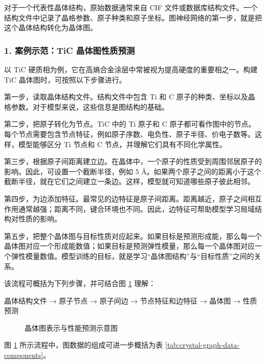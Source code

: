 对于一个代表性晶体结构，原始数据通常来自 CIF 文件或数据库结构文件。一个结构文件中记录了晶格参数、原子种类和原子坐标。图神经网络的第一步，就是把这个晶体结构转化为晶体图。


\subsubsection*{\textbf{1. 案例示范：TiC 晶体图性质预测}}

以 TiC 硬质相为例，它在高熵合金涂层中常被视为提高硬度的重要相之一。构建 TiC 晶体图时，可按照以下步骤进行。


第一步，读取晶体结构文件。结构文件中包含 Ti 和 C 原子的种类、坐标以及晶格参数。对于模型来说，这些信息是图结构的基础。


第二步，把原子转化为节点。TiC 中的 Ti 原子和 C 原子都可看作图中的节点。每个节点需要包含节点特征，例如原子序数、电负性、原子半径、价电子数等。这样，模型能够区分 Ti 节点和 C 节点，并理解它们具有不同化学属性。


第三步，根据原子间距离建立边。在晶体中，一个原子的性质受到周围邻居原子的影响。因此，可设置一个截断半径，例如 5 \AA{}。如果两个原子之间的距离小于这个截断半径，就在它们之间建立一条边。这样，模型就可知道哪些原子彼此相邻。


第四步，为边添加特征。最常见的边特征是原子间距离。距离越近，原子之间相互作用通常越强；距离不同，键合环境也不同。因此，边特征可帮助模型学习局域结构对性质的影响。


第五步，把整个晶体图与目标性质对应起来。如果目标是预测形成能，那么每一个晶体图对应一个形成能数值；如果目标是预测弹性模量，那么每一个晶体图对应一个弹性模量数值。模型训练的目标，就是学习“晶体图结构”与“目标性质”之间的关系。


该流程可概括为下列步骤，并可结合图 \ref{fig:crystal-graph-prediction} 理解：


\begin{lightquote}
\centering 晶体结构文件 → 原子节点 → 原子间边 → 节点特征和边特征 → 晶体图 → 性质预测
\end{lightquote}

\begin{figure}[H]
\centering
{}
\caption{晶体图表示与性能预测示意图}
\label{fig:crystal-graph-prediction}
\end{figure}
\FloatBarrier

图 \ref{fig:crystal-graph-prediction} 所示流程中，图数据的组成可进一步概括为表 \ref{tab:crystal-graph-data-components}。


